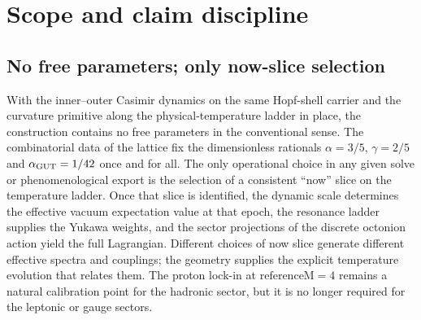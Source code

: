 \documentclass[11pt]{amsart}
\begin{document}
\begin{abstract}
\noindent\textbf{Patch-ontology reader contract.}
Per the patch-theory reader contract below, the discrete patch
layer is the ontology. Smooth-manifold textbook notation for
$\mathcal{L}_{\rm SM}$ is a calculation-approximation rewrite
for cross-citation only---not a foundational target, not a
mesh-refinement programme, and not required for validity of the
discrete bridge. At the load-bearing steps (shell index $m$,
resonance ladder, $\kappa_6$ factorisation, and the rationals above) a
literal continuum rewrite would erase the discrete index doing the
predictive work.

\noindent\textbf{Status.}
What is proved: the five sector equalities, the total-action
split, and Yukawa linearity over flavours, all under the
dynamic inner--outer Casimir scale. The theory now carries
zero free parameters beyond the discrete lattice data; the
only operational choice is the identification of a consistent
``now'' slice on the temperature ladder. What is named explicitly
and \emph{not} claimed: anomaly cancellation, measure choice,
and the full non-abelian holonomy upgrade (scaffolded upstream
but not closed here).
\end{abstract}
\maketitle



\section{Scope and claim discipline}
\label{sec:scope}

\subsection{No free parameters; only now-slice selection}

With the inner--outer Casimir dynamics on the same Hopf-shell carrier
and the curvature primitive along the physical-temperature ladder
in place, the construction contains no free parameters in the
conventional sense. The combinatorial data of the lattice fix
the dimensionless rationals $\alpha=3/5$, $\gamma=2/5$ and
$\alpha_{\rm GUT}=1/42$ once and for all. The only operational
choice in any given solve or phenomenological export is the
selection of a consistent ``now'' slice on the temperature ladder.
Once that slice is identified, the dynamic scale determines the
effective vacuum expectation value at that epoch, the resonance
ladder supplies the Yukawa weights, and the sector projections of
the discrete octonion action yield the full Lagrangian. Different
choices of now slice generate different effective spectra and
couplings; the geometry supplies the explicit temperature evolution
that relates them. The proton lock-in at $\mathrm{referenceM}=4$
remains a natural calibration point for the hadronic sector, but
it is no longer required for the leptonic or gauge sectors.
\end{document}
